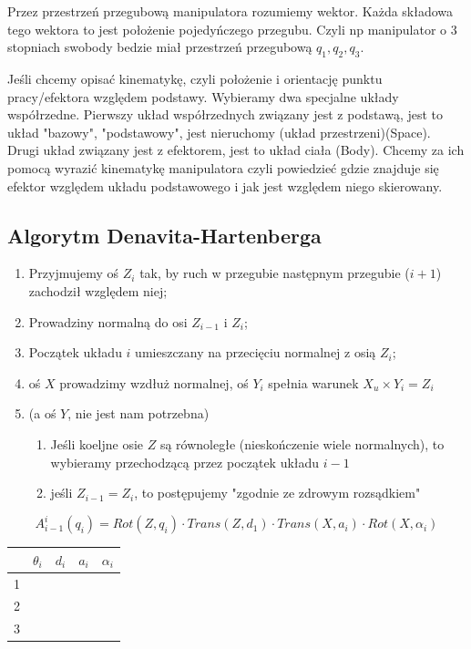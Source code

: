 \documentclass{article}
\begin{document}
Przez przestrzeń przegubową manipulatora rozumiemy wektor. Każda składowa tego wektora to jest położenie pojedyńczego przegubu. Czyli np manipulator o 3 stopniach swobody bedzie miał przestrzeń przegubową $q_{1}, q_{2}, q_{3}$.

Jeśli chcemy opisać kinematykę, czyli położenie i orientację punktu pracy/efektora względem podstawy. Wybieramy dwa specjalne układy współrzedne.
Pierwszy układ współrzednych związany jest z podstawą, jest to układ "bazowy", "podstawowy", jest nieruchomy (układ przestrzeni)(Space).
Drugi układ związany jest z efektorem, jest to układ ciała (Body).
Chcemy za ich pomocą wyrazić kinematykę manipulatora czyli powiedzieć gdzie znajduje się efektor względem układu podstawowego i jak jest względem niego skierowany.

\newpage

\subsection{Algorytm Denavita-Hartenberga}

\begin{enumerate}
    \item Przyjmujemy oś $Z_i$ tak, by ruch w przegubie następnym przegubie ($i+1$) zachodził względem niej;
    \item Prowadziny normalną do osi $Z_{i-1}$ i $Z_i$;
    \item Początek układu $i$ umieszczany na przecięciu normalnej z osią $Z_i$;
    \item oś $X$ prowadzimy wzdłuż normalnej, oś $Y_i$ spełnia warunek $X_u \times Y_i = Z_i$
    \item (a oś $Y$, nie jest nam potrzebna)
          \begin{enumerate}
              \item Jeśli koeljne osie $Z$ są równoległe (nieskończenie wiele normalnych),
                    to wybieramy przechodzącą przez początek układu $i-1$
              \item jeśli $Z_{i-1} = Z_i$, to postępujemy "zgodnie ze zdrowym rozsądkiem"
          \end{enumerate}
\end{enumerate}

\Large
$$
    A_{i-1}^i (q_i) = Rot(Z,q_i) \cdot Trans(Z,d_1) \cdot Trans( X, a_i ) \cdot Rot( X, \alpha_i )
$$
\normalsize

\begin{table}[h!]
    \centering
    \Large
    \begin{tabular}{c|c|c|c|c}
          & $\theta_i$ & $d_i$ & $a_i$ & $\alpha_i$ \\ \hline
        1 &            &       &       &            \\ \hline
        2 &            &       &       &            \\ \hline
        3 &            &       &       &            \\
    \end{tabular}
\end{table}
\end{document}
